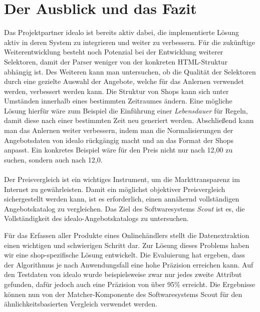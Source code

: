 \section{Der Ausblick und das Fazit}
\label{sec:abschluss}

Das Projektpartner idealo ist bereits aktiv dabei, die implementierte Lösung aktiv in deren System zu
integrieren und weiter zu verbessern.
Für die zukünftige Weiterentwicklung besteht noch Potenzial bei der Entwicklung weiterer Selektoren, damit der Parser
weniger von der konkreten HTML-Struktur abhängig ist.
Des Weiteren kann man untersuchen, ob die Qualität der Selektoren durch eine gezielte Auswahl der Angebote, welche
für das Anlernen verwendet werden, verbessert werden kann.
Die Struktur von Shops kann sich unter Umständen innerhalb eines bestimmten Zeitraumes ändern.
Eine mögliche Lösung hierfür wäre zum Beispiel die Einführung einer \textit{Lebensdauer} für Regeln, damit diese nach
einer bestimmten Zeit neu generiert werden.
Abschließend kann man das Anlernen weiter verbessern, indem man die Normalisierungen der Angebotsdaten von idealo
rückgängig macht und an das Format der Shops anpasst.
Ein konkretes Beispiel wäre für den Preis nicht nur nach 12,00 zu suchen, sondern auch nach 12,0.
\\
~\\
Der Preisvergleich ist ein wichtiges Instrument, um die Markttransparenz im Internet zu gewährleisten.
Damit ein möglichst objektiver Preisvergleich sichergestellt werden kann, ist es erforderlich, einen annähernd
vollständigen Angebotskatalog zu vergleichen.
Das Ziel des Softwaresystems \textit{Scout} ist es, die Vollständigkeit des idealo-Angebotskatalogs zu untersuchen.

Für das Erfassen aller Produkte eines Onlinehändlers stellt die Datenextraktion einen wichtigen und schwierigen
Schritt dar.
Zur Lösung dieses Problems haben wir eine shop-spezifische Lösung entwickelt.
Die Evaluierung hat ergeben, dass der Algorithmus je nach Anwendungsfall eine hohe Präzision erreichen kann.
Auf den Testdaten von idealo wurde beispielsweise zwar nur jedes zweite Attribut gefunden, dafür jedoch auch eine
Präzision von über 95\% erreicht.
Die Ergebnisse können nun von der Matcher-Komponente des Softwaresystems Scout für den ähnlichkeitsbasierten
Vergleich verwendet werden.